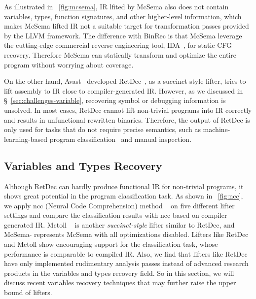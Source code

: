 As illustrated in \F~\ref{fig:mcsema}, IR lfited by McSema also does not 
contain variables, types, function signatures, and other higher-level 
information, which makes McSema lifted IR not a suitable target for 
transformation passes provided by the LLVM framework. The difference with 
BinRec is that McSema leverage the cutting-edge commercial reverse engineering 
tool, IDA~\cite{hex2014ida}, for static CFG recovery. Therefore McSema can 
statically transform and optimize the entire program without worrying about 
coverage.

On the other hand, Avast~\cite{avast} developed RetDec~\cite{retdec}, as a 
succinct-style lifter, tries to lift assembly to IR close to compiler-generated 
IR. However, as we discussed in \S~\ref{sec:challenges-variable}, recovering 
symbol or debugging information is unsolved. In most cases, RetDec cannot lift 
non-trivial programs into IR correctly and results in unfunctional rewritten 
binaries. Therefore, the output of RetDec is only used for tasks that do not 
require precise semantics, such as machine-learning-based program 
classification~\cite{ben2018neural} and manual inspection.


\subsection{Variables and Types Recovery} \label{sec:existing-recovery}
Although RetDec can hardly produce functional IR for non-trivial programs, it 
shows great potential in the program classification task. As shown in 
\F~\ref{fig:ncc}, we apply ncc (Neural Code Comprehension) method
~\cite{ben2018neural} on five different lifter settings and compare the 
classification results with ncc based on compiler-generated IR. Mctoll
~\cite{mctoll} is another \textit{succinct-style} lifter similar to RetDec, and 
McSema- represents McSema with all optimizations disabled. Lifters like RetDec 
and Mctoll show encouraging support for the classification task, whose 
performance is comparable to compiled IR.
Also, we find that lifters like RetDec have only implemented rudimentary 
analysis passes instead of advanced research products in the variables and 
types recovery field. So in this section, we will discuss recent variables 
recovery techniques that may further raise the upper bound of lifters.

